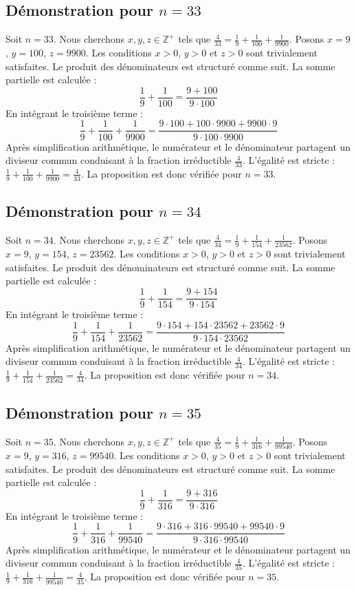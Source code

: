 \documentclass[11pt,a4paper]{article}
\begin{document}
\subsection{Démonstration pour $n = 33$}
Soit $n = 33$. Nous cherchons $x, y, z \in \mathbb{Z}^{+}$ tels que $\frac{4}{33} = \frac{1}{9} + \frac{1}{100} + \frac{1}{9900}$.
Posons $x = 9$, $y = 100$, $z = 9900$.
Les conditions $x > 0$, $y > 0$ et $z > 0$ sont trivialement satisfaites.
Le produit des dénominateurs est structuré comme suit. La somme partielle est calculée :
$$ \frac{1}{9} + \frac{1}{100} = \frac{9+100}{9 \cdot 100} $$
En intégrant le troisième terme :
$$ \frac{1}{9} + \frac{1}{100} + \frac{1}{9900} = \frac{9 \cdot 100 + 100 \cdot 9900 + 9900 \cdot 9}{9 \cdot 100 \cdot 9900} $$
Après simplification arithmétique, le numérateur et le dénominateur partagent un diviseur commun conduisant à la fraction irréductible $\frac{4}{33}$.
L'égalité est stricte : $\frac{1}{9} + \frac{1}{100} + \frac{1}{9900} = \frac{4}{33}$.
La proposition est donc vérifiée pour $n = 33$.
\subsection{Démonstration pour $n = 34$}
Soit $n = 34$. Nous cherchons $x, y, z \in \mathbb{Z}^{+}$ tels que $\frac{4}{34} = \frac{1}{9} + \frac{1}{154} + \frac{1}{23562}$.
Posons $x = 9$, $y = 154$, $z = 23562$.
Les conditions $x > 0$, $y > 0$ et $z > 0$ sont trivialement satisfaites.
Le produit des dénominateurs est structuré comme suit. La somme partielle est calculée :
$$ \frac{1}{9} + \frac{1}{154} = \frac{9+154}{9 \cdot 154} $$
En intégrant le troisième terme :
$$ \frac{1}{9} + \frac{1}{154} + \frac{1}{23562} = \frac{9 \cdot 154 + 154 \cdot 23562 + 23562 \cdot 9}{9 \cdot 154 \cdot 23562} $$
Après simplification arithmétique, le numérateur et le dénominateur partagent un diviseur commun conduisant à la fraction irréductible $\frac{4}{34}$.
L'égalité est stricte : $\frac{1}{9} + \frac{1}{154} + \frac{1}{23562} = \frac{4}{34}$.
La proposition est donc vérifiée pour $n = 34$.
\subsection{Démonstration pour $n = 35$}
Soit $n = 35$. Nous cherchons $x, y, z \in \mathbb{Z}^{+}$ tels que $\frac{4}{35} = \frac{1}{9} + \frac{1}{316} + \frac{1}{99540}$.
Posons $x = 9$, $y = 316$, $z = 99540$.
Les conditions $x > 0$, $y > 0$ et $z > 0$ sont trivialement satisfaites.
Le produit des dénominateurs est structuré comme suit. La somme partielle est calculée :
$$ \frac{1}{9} + \frac{1}{316} = \frac{9+316}{9 \cdot 316} $$
En intégrant le troisième terme :
$$ \frac{1}{9} + \frac{1}{316} + \frac{1}{99540} = \frac{9 \cdot 316 + 316 \cdot 99540 + 99540 \cdot 9}{9 \cdot 316 \cdot 99540} $$
Après simplification arithmétique, le numérateur et le dénominateur partagent un diviseur commun conduisant à la fraction irréductible $\frac{4}{35}$.
L'égalité est stricte : $\frac{1}{9} + \frac{1}{316} + \frac{1}{99540} = \frac{4}{35}$.
La proposition est donc vérifiée pour $n = 35$.
\end{document}
